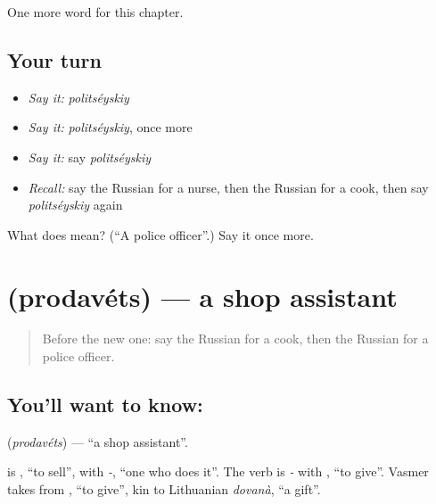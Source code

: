 \begin{grammarlens}[title={What you've built}]
One more word for this chapter.
\end{grammarlens}

\subsection*{Your turn}
\begin{itemize}
\raggedright
  \item \emph{Say it:} \emph{politséyskiy}
  \item \emph{Say it:} \emph{politséyskiy}, once more
  \item \emph{Say it:} say \emph{politséyskiy}
  \item \emph{Recall:} say the Russian for a nurse, then the Russian for a cook, then say \emph{politséyskiy} again
\end{itemize}

\begin{tcolorbox}[breakable,colback=teal!4,colframe=teal!35!black,title={Before you move on}]
What does  mean? (\textquotedblleft{}A police officer\textquotedblright{}.) Say it once more.
\end{tcolorbox}
\section[\texorpdfstring{\ru{продавец} (prodavéts)}{продавец (prodavéts)}]{ (prodavéts) — a shop assistant}

\label{lesson:RU-C108-shop-assistant}



\begin{quote}
Before the new one: say the Russian for a cook, then the Russian for a police officer.
\end{quote}

\subsection*{You'll want to know: }
\textbf{} (\emph{prodavéts}) — \textquotedblleft{}a shop assistant\textquotedblright{}.

\begin{cousinweb}
\textbf{} is \emph{}, \textquotedblleft{}to sell\textquotedblright{}, with \emph{-}, \textquotedblleft{}one who does it\textquotedblright{}. The verb is \emph{-} with \emph{}, \textquotedblleft{}to give\textquotedblright{}. Vasmer takes \emph{} from \emph{}, \textquotedblleft{}to give\textquotedblright{}, kin to Lithuanian \emph{dovanà}, \textquotedblleft{}a gift\textquotedblright{}.
\end{cousinweb}

